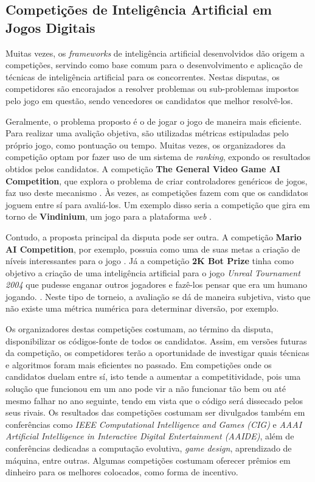 \subsection{Competições de Inteligência Artificial em Jogos Digitais}
Muitas vezes, os \textit{frameworks} de inteligência artificial desenvolvidos
dão origem a competições, servindo como base comum para o desenvolvimento e
aplicação de técnicas de inteligência artificial para os concorrentes. Nestas
disputas, os competidores são encorajados a resolver problemas ou sub-problemas
impostos pelo jogo em questão, sendo vencedores os candidatos que melhor
resolvê-los.

Geralmente, o problema proposto é o de jogar o jogo de maneira mais eficiente.
Para realizar uma avalição objetiva, são utilizadas métricas estipuladas pelo
próprio jogo, como pontuação ou tempo. Muitas vezes, os organizadores da
competição optam por fazer uso de um sistema de \textit{ranking}, expondo os
resultados obtidos pelos candidatos. A competição \textbf{The General Video
Game AI Competition}, que explora o problema de criar controladores genéricos
de jogos, faz uso deste mecanismo \cite{GVGAIWEB}.  Às vezes, as competições
fazem com que os candidatos joguem entre sí para avaliá-los.  Um exemplo disso
seria a competição que gira em torno de \textbf{Vindinium}, um jogo para a
plataforma \textit{web} \cite{VINDINIUMWEB}.

Contudo, a proposta principal da disputa pode ser outra. A competição
\textbf{Mario AI Competition}, por exemplo, possuia como uma de suas metas a
criação de níveis interessantes para o jogo \cite{MARIOAIWEB}. Já a competição
\textbf{2K Bot Prize} tinha como objetivo a criação de uma inteligência
artificial para o jogo \textit{Unreal Tournament 2004} que pudesse enganar
outros jogadores e fazê-los pensar que era um humano jogando.
\cite{UNREALAIWEB}. Neste tipo de torneio, a avaliação se dá de maneira
subjetiva, visto que não existe uma métrica numérica para determinar diversão,
por exemplo.

Os organizadores destas competições costumam, ao término da disputa,
disponibilizar os códigos-fonte de todos os candidatos. Assim, em versões
futuras da competição, os competidores terão a oportunidade de investigar quais
técnicas e algoritmos foram mais eficientes no passado. Em competições onde os
candidatos duelam entre sí, isto tende a aumentar a competitividade, pois uma
solução que funcionou em um ano pode vir a não funcionar tão bem ou até mesmo
falhar no ano seguinte, tendo em vista que o código será dissecado pelos seus
rivais. Os resultados das competições costumam ser divulgados também em
conferências como \textit{IEEE Computational Intelligence and Games (CIG)} e
\textit{AAAI Artificial Intelligence in Interactive Digital Entertainment
(AAIDE)}, além de conferências dedicadas a computação evolutiva, \textit{game
design}, aprendizado de máquina, entre outras. Algumas competições costumam
oferecer prêmios em dinheiro para os melhores colocados, como forma de
incentivo.



